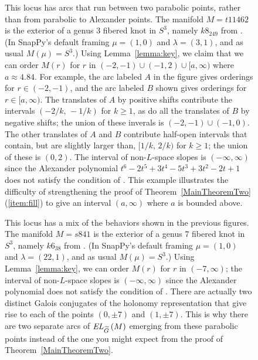 \documentclass[tikz, sepfignums, defaultenums]{nmd/article}
\newcommand{\TEL}[1]{\mathit{EL}_\Gtil\left(#1\right)}
\begin{document}
\begin{figure}
  \begin{center}
  \end{center}

  \caption{This locus has arcs that run between two parabolic points,
    rather than from parabolic to Alexander points.  The manifold
    $M = t11462$ is the exterior of a genus 3 fibered knot in $S^3$,
    namely $k8_{249}$ from \cite{ChampanerkarKofmanMullen2014}.  (In
    SnapPy's default framing $\mu = (1,0)$ and $\lambda = (3, 1)$, and
    as usual $M(\mu) = S^3$.)  Using Lemma~\ref{lemma:key}, we claim
    that we can order $M(r)$ for $r$ in
    $(-2, -1) \cup (-1, 2) \cup [a, \infty)$ where $a \approx 4.84$.
    For example, the arc labeled $A$ in the figure gives orderings for
    $r\in(-2, -1)$, and the arc labeled $B$ shown gives orderings for
    $r\in[a, \infty)$.  The translates of $A$ by positive shifts
    contribute the intervals $(-2/k, \, -1/k)$ for $k \geq 1$, as do
    all the translates of $B$ by negative shifts; the union of these
    inverals is $(-2, -1) \cup (-1, 0)$.  The other translates of $A$
    and $B$ contribute half-open intervals that contain, but are
    slightly larger than, $[1/k, \, 2/k)$ for $k \geq 1$; the union of
    these is $(0, 2)$. The interval of non-$L$-space slopes is
    $(-\infty, \infty)$ since the Alexander polynomial
    $t^6 - 2t^5 + 3t^4 - 5t^3 + 3t^2 - 2t + 1$ does not satisfy the
    condition of \cite[Corollary~1.3]{OSLensSpace2005}. This example
    illustrates the difficulty of strengthening the proof of
    Theorem~\ref{MainTheoremTwo}(\ref{item:fill}) to give an interval
    $(a, \infty)$ where $a$ is bounded above. }
  \label{fig:t11462}
\end{figure}

\begin{figure}
  \begin{center}
  \end{center}

  \caption{This locus has a mix of the behaviors shown in the previous
    figures.  The manifold $M = s841$ is the exterior of a genus 7
    fibered knot in $S^3$, namely $k6_{38}$ from
    \cite{ChampanerkarKofmanMullen2014}. (In SnapPy's default framing
    $\mu = (1,0)$ and $\lambda = (22, 1)$, and as usual
    $M(\mu) = S^3$.)  Using Lemma~\ref{lemma:key}, we can order $M(r)$
    for $r$ in $(-7, \infty)$; the interval of non-$L$-space slopes is
    $(-\infty, \infty)$ since the Alexander polynomial does not
    satisfy the condition of
    \cite[Corollary~1.3]{OSLensSpace2005}. There are actually two
    distinct Galois conjugates of the holonomy representation that
    give rise to each of the points $(0, \pm 7)$ and $(1, \pm 7)$. 
    This is why there are two separate arcs of $\TEL{M}$ emerging from
    these parabolic points instead of the one you might expect from
    the proof of Theorem~\ref{MainTheoremTwo}.  }
  \label{fig:s841}
\end{figure}
\end{document}
